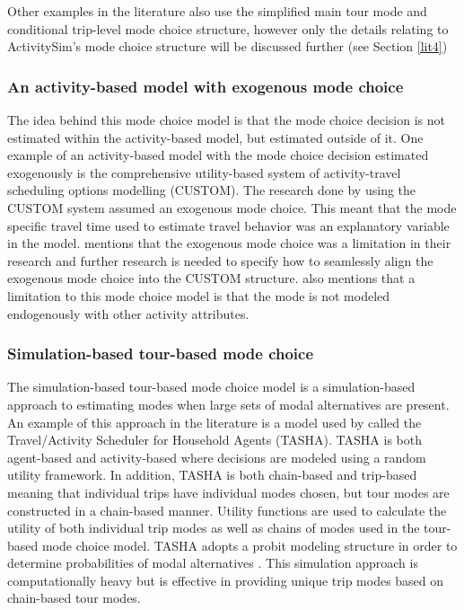 \documentclass[3p, authoryear, review]{elsarticle} %
\begin{document}
Other examples in the literature also use the simplified main tour mode and conditional trip-level mode choice structure, however only the details relating to ActivitySim's mode choice structure will be discussed further (see Section \ref{lit4})

\hypertarget{lit34}{%
\subsubsection{An activity-based model with exogenous mode choice}\label{lit34}}

The idea behind this mode choice model is that the mode choice decision is not estimated within the activity-based model, but estimated outside of it. One example of an activity-based model with the mode choice decision estimated exogenously is the comprehensive utility-based system of activity-travel scheduling options modelling (CUSTOM). The research done by \citet{habib17} using the CUSTOM system assumed an exogenous mode choice. This meant that the mode specific travel time used to estimate travel behavior was an explanatory variable in the model. \citet{habib17} mentions that the exogenous mode choice was a limitation in their research and further research is needed to specify how to seamlessly align the exogenous mode choice into the CUSTOM structure. \citet{hasnine21} also mentions that a limitation to this mode choice model is that the mode is not modeled endogenously with other activity attributes.

\hypertarget{lit35}{%
\subsubsection{Simulation-based tour-based mode choice}\label{lit35}}

The simulation-based tour-based mode choice model is a simulation-based approach to estimating modes when large sets of modal alternatives are present. An example of this approach in the literature is a model used by \citet{miller05} called the Travel/Activity Scheduler for Household Agents (TASHA). TASHA is both agent-based and activity-based where decisions are modeled using a random utility framework. In addition, TASHA is both chain-based and trip-based meaning that individual trips have individual modes chosen, but tour modes are constructed in a chain-based manner. Utility functions are used to calculate the utility of both individual trip modes as well as chains of modes used in the tour-based mode choice model. TASHA adopts a probit modeling structure in order to determine probabilities of modal alternatives \citep{miller05, hasnine21}. This simulation approach is computationally heavy but is effective in providing unique trip modes based on chain-based tour modes.
\end{document}
